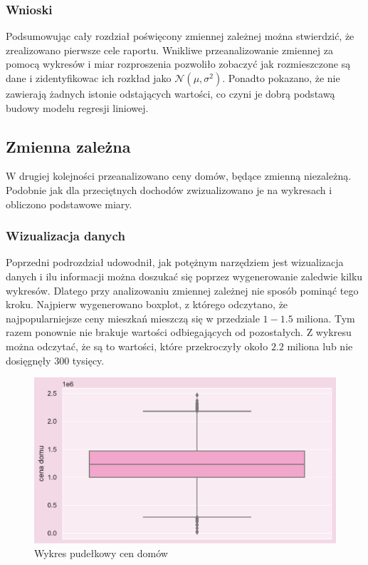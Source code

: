 \documentclass{article}
\begin{document}
\subsubsection{Wnioski}
Podsumowując cały rozdział poświęcony  zmiennej zależnej można stwierdzić, że zrealizowano pierwsze cele raportu. Wnikliwe przeanalizowanie zmiennej za pomocą wykresów i miar rozproszenia pozwoliło zobaczyć jak rozmieszczone są dane i zidentyfikowac ich rozkład jako $\mathcal{N}$$(\mu,\sigma^2)$.  Ponadto pokazano, że nie zawierają żadnych istonie odstających wartości, co czyni je dobrą podstawą budowy modelu regresji liniowej.

\subsection{Zmienna zależna}
W drugiej kolejności przeanalizowano ceny domów, będące zmienną niezależną. Podobnie jak dla przeciętnych dochodów zwizualizowano je na wykresach i obliczono podstawowe miary. 

\subsubsection{Wizualizacja danych}
Poprzedni podrozdział udowodnił, jak potężnym narzędziem jest wizualizacja danych i ilu informacji można doszukać się poprzez wygenerowanie zaledwie kilku wykresów. Dlatego przy analizowaniu zmiennej zależnej nie sposób pominąć tego kroku.
Najpierw wygenerowano boxplot, z którego odczytano, że najpopularniejsze ceny mieszkań mieszczą się w przedziale $1-1.5$ miliona. Tym razem ponownie nie brakuje wartości odbiegających od pozostałych. Z wykresu można odczytać, że są to wartości, które przekroczyły około $2.2$ miliona lub nie dosięgnęły $300$ tysięcy.
    \begin{figure}[H] 
	\begin{center}
		\includegraphics[scale=0.68]{images/price_box.pdf}
		\caption{Wykres pudełkowy cen domów}
		\label{denistyx}
	\end{center}
	\end{figure}
 
\end{document}
